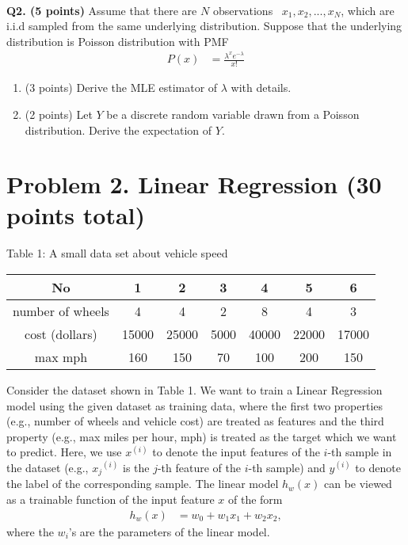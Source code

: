 \documentclass[11pt]{article}
\begin{document}

\paragraph{}
\textbf{\hspace{-0.4cm}Q2. (5 points)} Assume that there are $N$ observations ~$x_1, x_2, ..., x_N$, which are i.i.d sampled from the same underlying distribution. Suppose that the underlying distribution is Poisson distribution with PMF
\begin{align*}
  P(x) &= \frac{\lambda ^ xe^{-\lambda}}{x!}
\end{align*}

\begin{enumerate}
    \item (3 points) Derive the MLE estimator of $\lambda$ with details.
    \item (2 points) Let $Y$ be a discrete random variable drawn from a Poisson distribution. Derive the expectation of $Y$.
\end{enumerate}

\section*{Problem 2. Linear Regression (30 points total)}

\begin{center}
\caption{Table 1: A small data set about vehicle speed\label{vehicle}}
\begin{tabular}{ |c|c|c|c|c|c|c| } 
 \hline
 No  & 1 & 2 & 3 & 4 & 5 & 6  \\ \hline
 number of wheels  & 4 & 4 & 2 & 8 & 4 & 3 \\ \hline
 cost (dollars) & 15000 & 25000 & 5000 & 40000 & 22000 & 17000 \\ \hline
max mph & 160 & 150 & 70 & 100 & 200 & 150\\ 
 \hline
 
\end{tabular}
\end{center}

Consider the dataset shown in Table 1. We want to train a Linear Regression model using the given dataset as training data, where the first two properties (e.g., number of wheels and vehicle cost) are treated as features and the third property (e.g., max miles per hour, mph) is treated as the target which we want to predict. Here, we use $x^{(i)}$ to denote the input features of the $i$-th sample in the dataset (e.g., ${x_j}^{(i)}$ is the $j$-th feature of the $i$-th sample) and $y^{(i)}$ to denote the label of the corresponding sample. The linear model $h_w({x})$ can be viewed as a trainable function of the input feature ${x}$ of the form
\begin{align*}
    h_w({x}) &= w_0 + w_1x_1 + w_2x_2,
\end{align*}
where the $w_i$'s are the parameters of the linear model.
\end{document}
